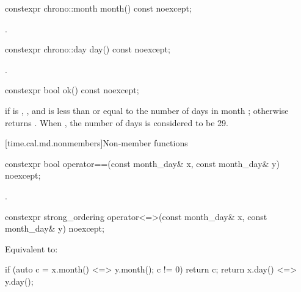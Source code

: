%
\begin{itemdecl}
constexpr chrono::month month() const noexcept;
\end{itemdecl}

\begin{itemdescr}
\pnum
\returns
{}.
\end{itemdescr}

%
\begin{itemdecl}
constexpr chrono::day day() const noexcept;
\end{itemdecl}

\begin{itemdescr}
\pnum
\returns
{}.
\end{itemdescr}

%
\begin{itemdecl}
constexpr bool ok() const noexcept;
\end{itemdecl}

\begin{itemdescr}
\pnum
\returns
{} if
 is ,
, and
 is less than or equal to the number of days in month ;
otherwise returns .
When ,
the number of days is considered to be 29.
\end{itemdescr}

[time.cal.md.nonmembers]{Non-member functions}

%
\begin{itemdecl}
constexpr bool operator==(const month_day& x, const month_day& y) noexcept;
\end{itemdecl}

\begin{itemdescr}
\pnum
\returns
{}.
\end{itemdescr}

%
\begin{itemdecl}
constexpr strong_ordering operator<=>(const month_day& x, const month_day& y) noexcept;
\end{itemdecl}

\begin{itemdescr}
\pnum
\effects
Equivalent to:
\begin{codeblock}
if (auto c = x.month() <=> y.month(); c != 0) return c;
return x.day() <=> y.day();
\end{codeblock}
\end{itemdescr}

